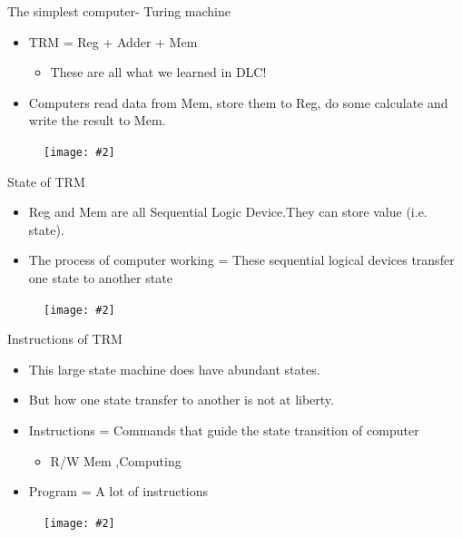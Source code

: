 \documentclass{beamer}
\newcommand{\fignocaption}[2]{
	\begin{figure}[htp]
		\centering
		\texttt{[image: \#2]}
	\end{figure}
}
\begin{document}
\begin{frame}{The simplest computer- Turing machine}
	\begin{itemize}
		\item TRM = Reg + Adder + Mem
		\begin{itemize}
			\item These are all what we learned in DLC!
		\end{itemize}
		\item Computers read data from Mem, store them to Reg, do some calculate and write the result to Mem.
	\end{itemize}
	\fignocaption{scale=0.5}{trm.png}
\end{frame}

\begin{frame}{State of TRM}
	\begin{itemize}
		\item Reg and Mem are all Sequential Logic Device.They can store value (i.e. state).
		\item The process of computer working = These sequential logical devices  \alert{transfer one state to another state}
	\end{itemize}
	\fignocaption{scale=0.3}{stateTRM.png}
\end{frame}

\begin{frame}{Instructions of TRM}
	\begin{itemize}
		\item This large state machine does have abundant states.
		\item But how one state transfer to another is not at liberty.
		\item \alert{Instructions = Commands that guide the state transition of computer}
		\begin{itemize}
			\item R/W Mem ,Computing
		\end{itemize}
		\item \alert{Program = A lot of instructions}	
	\end{itemize}
\fignocaption{scale=0.4}{stateTRM2.png}
\end{frame}
\end{document}
